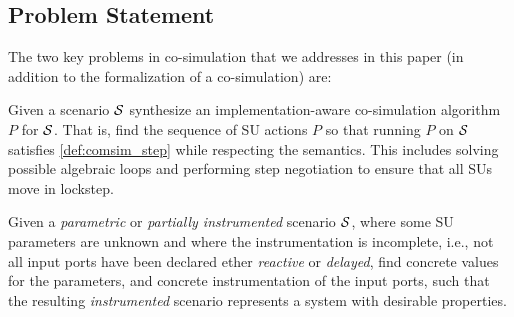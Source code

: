 \subsection{Problem Statement}
The two key problems in co-simulation that we addresses in this paper (in addition to the formalization of a co-simulation) are:
\begin{compactenum}
  \item Given a scenario $\mathcal{S}$ synthesize an implementation-aware co-simulation algorithm $P$ for $\mathcal{S}$.
  That is, find the sequence of SU actions $P$ so that running $P$ on $\mathcal{S}$ satisfies \cref{def:comsim_step} while respecting the semantics.
  This includes solving possible algebraic loops and performing step negotiation to ensure that all SUs move in lockstep.
  \item Given a \emph{parametric} or \emph{partially instrumented} scenario $\mathcal{S}$, where some SU parameters are unknown and where the instrumentation is incomplete, i.e., not all input ports have been declared ether \emph{reactive} or \emph{delayed}, find concrete values for the parameters, and concrete instrumentation of the input ports, such that the resulting \emph{instrumented} scenario represents a system with desirable properties.
\end{compactenum}
